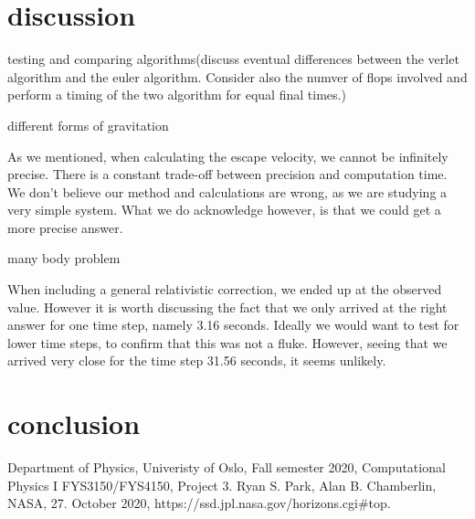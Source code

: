 \documentclass[reprint, english,notitlepage,nofootinbib]{revtex4-1}  %
\begin{document}
\section{discussion}

testing and comparing algorithms(discuss eventual differences between the verlet algorithm and the euler algorithm. Consider also the numver of flops involved and perform a timing of the two algorithm for equal final times.)

different forms of gravitation

As we mentioned, when calculating the escape velocity, we cannot be infinitely precise. There is a constant trade-off between precision and computation time. We don't believe our method and calculations are wrong, as we are studying a very simple system. What we do acknowledge however, is that we could get a more precise answer.

many body problem

When including a general relativistic correction, we ended up at the observed value. However it is worth discussing the fact that we only arrived at the right answer for one time step, namely 3.16 seconds. Ideally we would want to test for lower time steps, to confirm that this was not a fluke. However, seeing that we arrived very close for the time step 31.56 seconds, it seems unlikely.

\section{conclusion}




\onecolumngrid
\vspace{1cm} %
\newpage

\begin{thebibliography}{}
 Department of Physics, Univeristy of Oslo, Fall semester 2020, Computational Physics I FYS3150/FYS4150, Project 3.
 Ryan S. Park, Alan B. Chamberlin, NASA, 27. October 2020, https://ssd.jpl.nasa.gov/horizons.cgi\#top.

\end{thebibliography}
\end{document}
